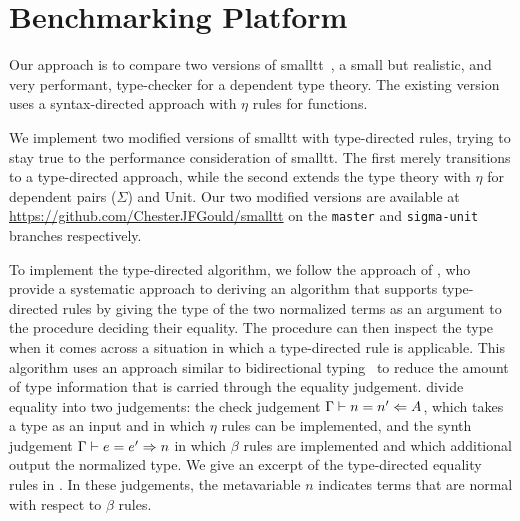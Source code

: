 \section{Benchmarking Platform}
Our approach is to compare two versions of smalltt~\cite{smalltt}, a small but realistic, and very performant, type-checker for a dependent type theory.
The existing version uses a syntax-directed approach with $\eta$ rules for functions.

We implement two modified versions of smalltt with type-directed rules, trying to stay true to the performance consideration of smalltt.
The first merely transitions to a type-directed approach, while the second extends the type theory with $\eta$ for dependent pairs ($\Sigma$) and Unit.
Our two modified versions are available at \url{https://github.com/ChesterJFGould/smalltt} on the \texttt{master} and \texttt{sigma-unit} branches respectively.

To implement the type-directed algorithm, we follow the approach of \citet{Chapman2005}, who provide a systematic approach to deriving an algorithm that supports type-directed rules by giving the type of the two normalized terms as an argument to the procedure deciding their equality.
The procedure can then inspect the type when it comes across a situation in which a type-directed rule is applicable.
This algorithm uses an approach similar to bidirectional typing~\cite{Dunfield2021} to reduce the amount of type information that is carried through the equality judgement.
\citet{Chapman2005} divide equality into two judgements: the check judgement $\Gamma \vdash n = n' \Leftarrow A$, which takes a type as an input and in which $\eta$ rules can be implemented, and the synth judgement $\Gamma \vdash e = e' \Rightarrow n$ in which $\beta$ rules are implemented and which additional output the normalized type.
We give an excerpt of the type-directed equality rules in .
In these judgements, the metavariable $n$ indicates terms that are normal with respect to $\beta$ rules.

% 

